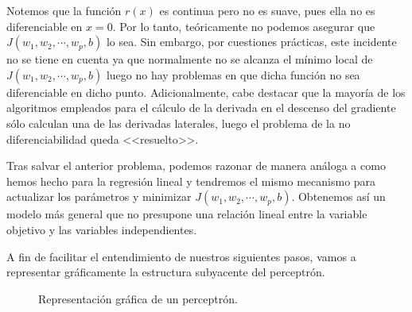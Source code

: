\documentclass[12pt, a4paper, twoside]{book}
\numberwithin{equation}{section}
\theoremstyle{definition}
\theoremstyle{remark}
\theoremstyle{plain}
\begin{document}
	Notemos que la función $r(x)$ es continua pero no es suave, pues ella
	no es diferenciable en $x=0$. Por lo tanto, teóricamente no podemos 
	asegurar que $J(w_{1},w_{2},\cdots,w_{p},b)$ lo sea. Sin embargo, por 
	cuestiones prácticas, 
	este incidente no se tiene en cuenta ya que normalmente no se alcanza
	el mínimo local de $J(w_{1},w_{2},\cdots,w_{p},b)$ luego no hay 
	problemas en que dicha 
	función no sea diferenciable en dicho punto. Adicionalmente, cabe 
	destacar que la mayoría de los algoritmos empleados para el cálculo de 
	la derivada en el descenso del gradiente sólo calculan una de las 
	derivadas laterales, luego el problema de la no diferenciabilidad 
	queda <<resuelto>>.

	Tras salvar el anterior problema, podemos razonar de manera análoga
	a como hemos hecho para la regresión lineal y tendremos el mismo 
	mecanismo para actualizar los parámetros y minimizar $J(w_{1},w_{2},
	\cdots,w_{p},b)$. 
	Obtenemos así un modelo más general que no presupone una relación 
	lineal entre la variable objetivo y las variables independientes. 
	
	A fin de facilitar el entendimiento de nuestros siguientes pasos, 
	vamos a representar gráficamente la estructura subyacente del 
	perceptrón.
	\begin{figure}[H]
		\centering
		\caption{Representación gráfica de un perceptrón.}
		\label{fig:perceptron}
	\end{figure}
\end{document}
